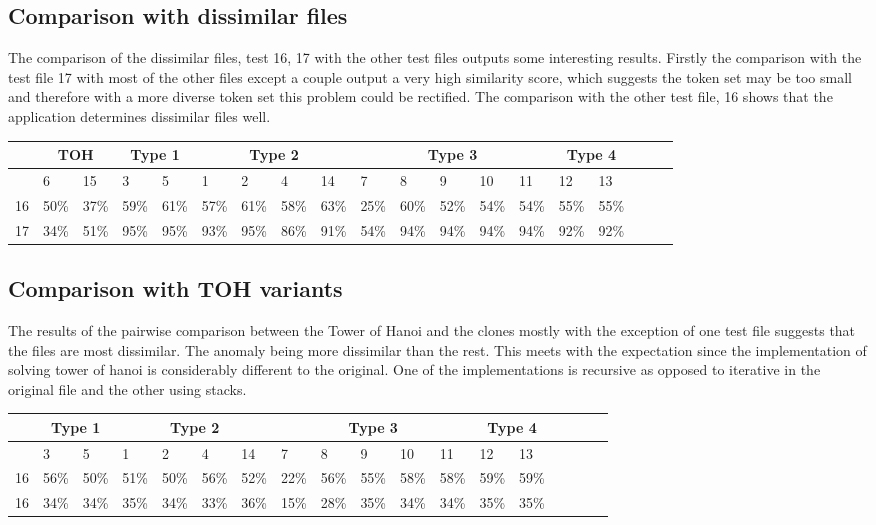 \subsection{Comparison with dissimilar files}
The comparison of the dissimilar files, test 16, 17 with the other test files outputs some interesting results. Firstly the comparison with the test file 17 with most of the other files except a couple output a very high similarity score, which suggests the token set may be too small and therefore with a more diverse token set this problem could be rectified. The comparison with the other test file, 16 shows that the application determines dissimilar files well.
\begin{table}[h]
\begin{tabular}{|l|l|l|l|l|l|l|l|l|l|l|l|l|l|l|l|l|l|l|}
\hline
& \multicolumn{2}{|c|}{TOH} & \multicolumn{2}{|c|}{Type 1} & \multicolumn{4}{|c|}{Type 2} & \multicolumn{5}{|c|}{Type 3} & \multicolumn{2}{|c|}{Type 4} \\
\hline
  & 6    & 15  & 3   & 5 & 1   & 2 & 4 & 14 & 7   & 8 & 9 & 10 & 11 & 12 & 13  \\
  \hline
16 & 50\% & 37\% & 59\% & 61\% & 57\% & 61\% & 58\% & 63\% & 25\% & 60\% & 52\% & 54\% & 54\% & 55\% & 55\%\\
\hline
17 & 34\% & 51\% & 95\% & 95\% & 93\% & 95\% & 86\% & 91\% & 54\% & 94\% & 94\% & 94\% & 94\% & 92\% & 92\%  \\
\hline
\end{tabular}
\end{table}

\break
\subsection{Comparison with TOH variants}
The results of the pairwise comparison between the Tower of Hanoi and the clones mostly with the exception of one test file suggests that the files are most dissimilar. The anomaly being more dissimilar than the rest. This meets with the expectation since the implementation of solving tower of hanoi is considerably different to the original. One of the implementations is recursive as opposed to iterative in the original file and the other using stacks.

\begin{table}[h]
\begin{tabular}{|l|l|l|l|l|l|l|l|l|l|l|l|l|l|l|l|l|l|}
\hline
& \multicolumn{2}{|c|}{Type 1} & \multicolumn{4}{|c|}{Type 2} & \multicolumn{5}{|c|}{Type 3} & \multicolumn{2}{|c|}{Type 4} \\
\hline
  & 3   & 5 & 1   & 2 & 4 & 14 & 7   & 8 & 9 & 10 & 11 & 12 & 13 \\
  \hline
16 & 56\% & 50\% & 51\% & 50\% & 56\% & 52\% & 22\% & 56\% & 55\% & 58\% & 58\% & 59\% & 59\%  \\
\hline
16 & 34\% & 34\% & 35\% & 34\% & 33\% & 36\% & 15\% & 28\% & 35\% & 34\% & 34\% & 35\% & 35\%  \\
\hline
\end{tabular}
\end{table}

